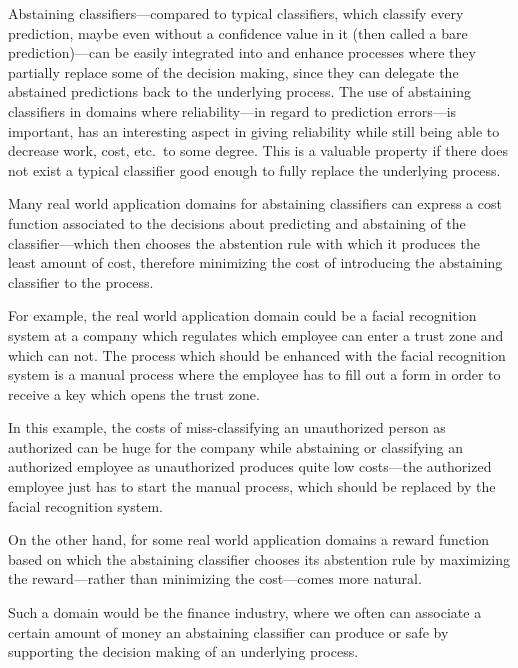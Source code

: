 \documentclass[twoside,11pt]{article}
\begin{document}
Abstaining classifiers---compared to typical classifiers,
which classify every prediction, maybe even without a
confidence value in it (then called a bare
prediction)---can be easily integrated into and enhance
processes where they partially replace some of the decision
making, since they can delegate the abstained predictions
back to the underlying process.
The use of abstaining classifiers in domains where
reliability---in regard to prediction errors---is
important, has an interesting aspect in giving
reliability while still being able to decrease work, cost,
etc.\ to some degree.
This is a valuable property if there does not exist a
typical classifier good enough to fully replace the
underlying process.

Many real world application domains for abstaining
classifiers can express a cost function associated to the
decisions about predicting and abstaining of the
classifier---which then chooses the abstention rule with
which it produces the least amount of cost, therefore
minimizing the cost of introducing the abstaining
classifier to the process.

For example, the real world application domain could be a
facial recognition system at a company which regulates
which employee can enter a trust zone and which can not.
The process which should be enhanced with the facial
recognition system is a manual process where the employee
has to fill out a form in order to receive a key which
opens the trust zone.

In this example, the costs of miss-classifying an
unauthorized person as authorized can be huge for
the company while abstaining or classifying an authorized
employee as unauthorized produces quite low costs---the
authorized employee just has to start the manual process,
which should be replaced by the facial recognition system.

On the other hand, for some real world application domains
a reward function based on which the abstaining classifier
chooses its abstention rule by maximizing the
reward---rather than minimizing the cost---comes more
natural.

Such a domain would be the finance industry,
where we often can associate a certain amount of money an
abstaining classifier can produce or safe by supporting the
decision making of an underlying process.
\end{document}
